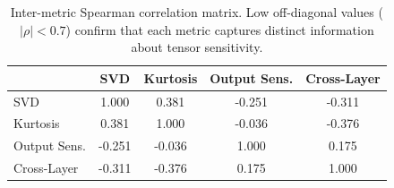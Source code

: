 \begin{table}[t]
\centering
\caption{Inter-metric Spearman correlation matrix. Low off-diagonal values ($|\rho| < 0.7$) confirm that each metric captures distinct information about tensor sensitivity.}
\label{tab:inter_metric}
\begin{tabular}{lcccc}
\toprule
  & SVD & Kurtosis & Output Sens. & Cross-Layer \\
\midrule
  SVD & 1.000 & 0.381 & -0.251 & -0.311 \\
  Kurtosis & 0.381 & 1.000 & -0.036 & -0.376 \\
  Output Sens. & -0.251 & -0.036 & 1.000 & 0.175 \\
  Cross-Layer & -0.311 & -0.376 & 0.175 & 1.000 \\
\bottomrule
\end{tabular}
\end{table}